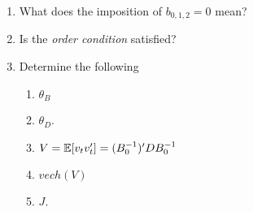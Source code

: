 \begin{enumerate}
    \item What does the imposition of $b_{0, 1, 2} = 0$ mean?
%

    \item Is the \emph{order condition} satisfied?

%
%
%

    \item Determine the following
          \begin{enumerate}[label=\roman*.]
              \item $\theta_B$
              \item $\theta_D$.
              \item $V = \operatorname*{\mathbb{E}}[v_t v_t'] = (B_0^{-1})' D B_0^{-1}$
              \item $vech(V)$
              \item $J$.
          \end{enumerate}



\end{enumerate}
